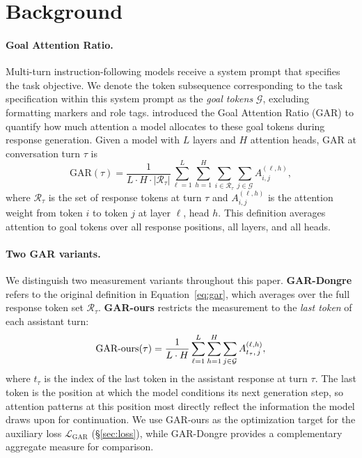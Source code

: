 \section{Background}\label{sec:background}

\paragraph{Goal Attention Ratio.}
Multi-turn instruction-following models receive a system prompt that specifies the task objective. We denote the token subsequence corresponding to the task specification within this system prompt as the \emph{goal tokens} $\mathcal{G}$, excluding formatting markers and role tags. \citet{dongre2026attention} introduced the Goal Attention Ratio (GAR) to quantify how much attention a model allocates to these goal tokens during response generation. Given a model with $L$ layers and $H$ attention heads, GAR at conversation turn $\tau$ is
\begin{equation}\label{eq:gar}
  \text{GAR}(\tau) = \frac{1}{L \cdot H \cdot |\mathcal{R}_\tau|} \sum_{\ell=1}^{L} \sum_{h=1}^{H} \sum_{i \in \mathcal{R}_\tau} \sum_{j \in \mathcal{G}} A_{i,j}^{(\ell,h)},
\end{equation}
where $\mathcal{R}_\tau$ is the set of response tokens at turn $\tau$ and $A_{i,j}^{(\ell,h)}$ is the attention weight from token $i$ to token $j$ at layer $\ell$, head $h$. This definition averages attention to goal tokens over all response positions, all layers, and all heads.

\paragraph{Two GAR variants.}
We distinguish two measurement variants throughout this paper. \textbf{GAR-Dongre} refers to the original definition in Equation~\ref{eq:gar}, which averages over the full response token set $\mathcal{R}_\tau$. \textbf{GAR-ours} restricts the measurement to the \emph{last token} of each assistant turn:
\begin{equation}\label{eq:gar-ours}
  \text{GAR\text{-}ours}(\tau) = \frac{1}{L \cdot H} \sum_{\ell=1}^{L} \sum_{h=1}^{H} \sum_{j \in \mathcal{G}} A_{t_\tau,\, j}^{(\ell,h)},
\end{equation}
where $t_\tau$ is the index of the last token in the assistant response at turn $\tau$. The last token is the position at which the model conditions its next generation step, so attention patterns at this position most directly reflect the information the model draws upon for continuation. We use GAR-ours as the optimization target for the auxiliary loss $\mathcal{L}_\text{GAR}$ (\S\ref{sec:loss}), while GAR-Dongre provides a complementary aggregate measure for comparison.


